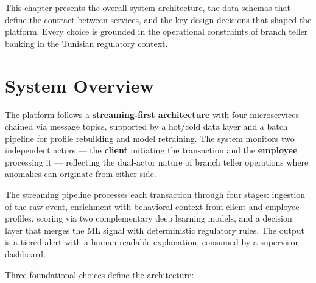 This chapter presents the overall system architecture, the data schemas that define
the contract between services, and the key design decisions that shaped the platform.
Every choice is grounded in the operational constraints of branch teller banking in
the Tunisian regulatory context.

\section{System Overview}

The platform follows a \textbf{streaming-first architecture} with four microservices
chained via message topics, supported by a hot/cold data layer and a batch pipeline
for profile rebuilding and model retraining. The system monitors two independent
actors --- the \textbf{client} initiating the transaction and the \textbf{employee}
processing it --- reflecting the dual-actor nature of branch teller operations where
anomalies can originate from either side.

The streaming pipeline processes each transaction through four stages: ingestion of
the raw event, enrichment with behavioral context from client and employee profiles,
scoring via two complementary deep learning models, and a decision layer that merges
the ML signal with deterministic regulatory rules. The output is a tiered alert
with a human-readable explanation, consumed by a supervisor dashboard.

Three foundational choices define the architecture:

